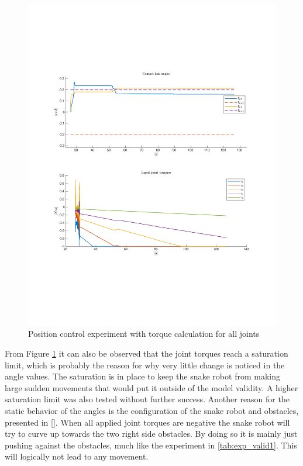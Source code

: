 \begin{figure}[H]
    \centering
    \includegraphics[trim=2.1cm 6cm 2.1cm 5cm, clip=true, width=\textwidth]{figures/experiments/2xpos/2xpos-2plot-fail.pdf}
    \caption{Position control experiment with torque calculation for all joints}
    \label{fig:2xp-1}
\end{figure}

From Figure \ref{fig:2xp-1} it can also be observed that the joint torques reach a saturation limit, which is probably the reason for why very little change is noticed in the angle values. The saturation is in place to keep the snake robot from making large sudden movements that would put it outside of the model validity. A higher saturation limit was also tested without further success. Another reason for the static behavior of the angles is the configuration of the snake robot and obstacles, presented in \ref{}. When all applied joint torques are negative the snake robot will try to curve up towards the two right side obstacles. By doing so it is mainly just pushing against the obstacles, much like the experiment in \ref{tab:exp_valid1}. This will logically not lead to any movement.

